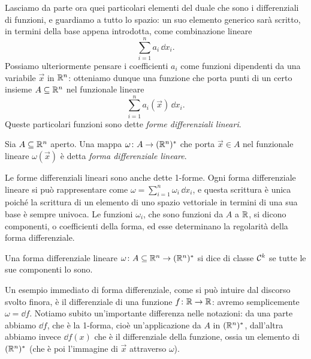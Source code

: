 Lasciamo da parte ora quei particolari elementi del duale che sono i differenziali di funzioni, e guardiamo a tutto lo spazio: un suo elemento generico sarà scritto, in termini della base appena introdotta, come combinazione lineare
\begin{equation*}
	\sum_{i=1}^na_i\,\dd x_i.
\end{equation*}
Possiamo ulteriormente pensare i coefficienti $a_i$ come funzioni dipendenti da una variabile $\vec x$ in $\mathbb{R}^n$: otteniamo dunque una funzione che porta punti di un certo insieme $A\subseteq\mathbb{R}^n$ nel funzionale lineare
\begin{equation*}
	\sum_{i=1}^na_i(\vec x)\,\dd x_i.
\end{equation*}
Queste particolari funzioni sono dette \emph{forme differenziali lineari}.

\begin{definizione} \label{d:forma-differenziale-lineare}
	Sia $A\subseteq\mathbb{R}^n$ aperto.
	Una mappa $\omega\colon A\to(\mathbb{R}^n)^*$ che porta $\vec x\in A$ nel funzionale lineare $\omega(\vec x)$ è detta \emph{forma differenziale lineare}.
\end{definizione}
Le forme differenziali lineari sono anche dette 1-forme.
Ogni forma differenziale lineare si può rappresentare come $\omega=\sum_{i=1}^n\omega_i\,\dd x_i$, e questa scrittura è unica poich\'e la scrittura di un elemento di uno spazio vettoriale in termini di una sua base è sempre univoca.
Le funzioni $\omega_i$, che sono funzioni da $A$ a $\mathbb{R}$, si dicono componenti, o coefficienti della forma, ed esse determinano la regolarità della forma differenziale.
\begin{definizione} \label{d:regolarita-1forme}
	Una forma differenziale lineare $\omega\colon A\subseteq\mathbb{R}^n\to(\mathbb{R}^n)^*$ si dice di classe $\mathcal{C}^{{k}}$ se tutte le sue componenti lo sono.
\end{definizione}

Un esempio immediato di forma differenziale, come si può intuire dal discorso svolto finora, è il differenziale di una funzione $f\colon\mathbb{R}\to\mathbb{R}$: avremo semplicemente $\omega=\dd f$.
Notiamo subito un'importante differenza nelle notazioni: da una parte abbiamo $\dd f$, che è la 1-forma, cioè un'applicazione da $A$ in $(\mathbb{R}^n)^*$, dall'altra abbiamo invece $\dd f(x)$ che è il differenziale della funzione, ossia un elemento di $(\mathbb{R}^n)^*$ (che è poi l'immagine di $\vec x$ attraverso $\omega$).
